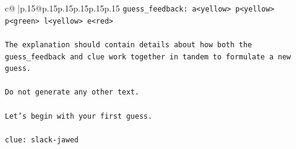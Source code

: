 \documentclass{article}
\begin{document}
{\begin{supertabular}{c@{$\;$}|p{.15\linewidth}@{}p{.15\linewidth}p{.15\linewidth}p{.15\linewidth}p{.15\linewidth}p{.15\linewidth}}
{{{\texttt{guess\_feedback: a<yellow> p<yellow> p<green> l<yellow> e<red>} \\
\\ 
\texttt{The explanation should contain details about how both the guess\_feedback and clue work together in tandem to formulate a new guess.} \\
\\ 
\texttt{Do not generate any other text.} \\
\\ 
\texttt{Let's begin with your first guess.} \\
\\ 
\texttt{clue: slack{-}jawed} \\
            }
        }
    }
     \\ \\


\end{supertabular}}
\end{document}
